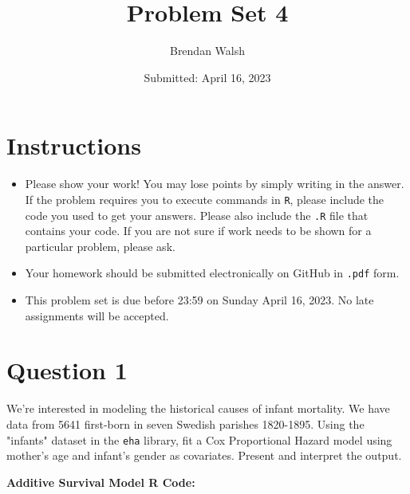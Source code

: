 \documentclass[12pt,letterpaper]{article}
\title{Problem Set 4}
\date{Submitted: April 16, 2023}
\author{Brendan Walsh}
\begin{document}
	\maketitle
	\section*{Instructions}
	\begin{itemize}
	\item Please show your work! You may lose points by simply writing in the answer. If the problem requires you to execute commands in \texttt{R}, please include the code you used to get your answers. Please also include the \texttt{.R} file that contains your code. If you are not sure if work needs to be shown for a particular problem, please ask.
	\item Your homework should be submitted electronically on GitHub in \texttt{.pdf} form.
	\item This problem set is due before 23:59 on Sunday April 16, 2023. No late assignments will be accepted.

	\end{itemize}

	\vspace{.25cm}
\section*{Question 1}
\vspace{.25cm}
\noindent We're interested in modeling the historical causes of infant mortality. We have data from 5641 first-born in seven Swedish parishes 1820-1895. Using the "infants" dataset in the \texttt{eha} library, fit a Cox Proportional Hazard model using mother's age and infant's gender as covariates. Present and interpret the output.

\vspace{.5cm}

\textbf{Additive Survival Model R Code:}

\vspace{.2cm} 
\end{document}
